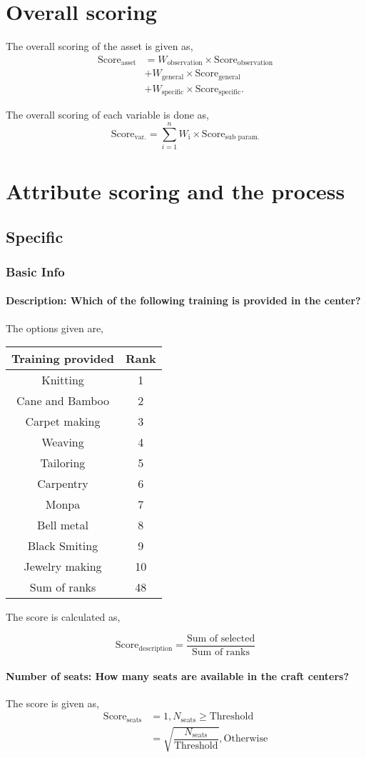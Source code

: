 \documentclass[oneside,twocolumn]{article}
\newcommand{\tsub}[2]{\text{#1}_{\text{#2}}}
\newcommand{\tsubb}[2]{#1_{\text{#2}}}
\newcommand{\dsub}[2]{\dfrac{\text{#1}}{\text{#2}}}
\newcommand{\multsel}[1]
{
	\[
		\tsub{Score}{#1} = \dsub{Sum of selected}{Sum of ranks}
	\]
}
\newenvironment{ttable}
{
\begin{center}
\begin{tabular}{c|c}
\hline
}
{
\\ \hline
\end{tabular}
\end{center}
}
\begin{document}
\section{Overall scoring}
The overall scoring of the asset is given as,
\begin{align*}
	\tsub{Score}{asset} &= \tsubb{W}{observation} \times \tsub{Score}{observation} \\
	&+ \tsubb{W}{general} \times \tsub{Score}{general} \\
	&+ \tsubb{W}{specific} \times \tsub{Score}{specific}.
\end{align*}

The overall scoring of each variable is done as,
\[
	\tsub{Score}{var.} = \sum_{i=1}^{n} \tsubb{W}{i} \times \tsub{Score}{sub param.}
\]
\section{Attribute scoring and the process}
\subsection{Specific}
\subsubsection{Basic Info}
\paragraph{Description: Which of the following training is provided in the center?} 
The options given are,
\begin{ttable}
	Training provided & Rank \\ \hline
	Knitting & 1 \\
	Cane and Bamboo & 2 \\
	Carpet making & 3 \\
	Weaving & 4 \\
	Tailoring & 5 \\
	Carpentry & 6 \\
	Monpa & 7 \\
	Bell metal & 8 \\
	Black Smiting & 9 \\
	Jewelry making & 10 \\ \hline
	Sum of ranks & 48 
\end{ttable}
The score is calculated as,
\multsel{description}
\paragraph{Number of seats: How many seats are available in the craft centers?}
The score is given as,
\begin{align*}
	\tsub{Score}{seats} &= 1, \tsubb{N}{seats} \ge \text{Threshold} \\
	&= \sqrt{\dfrac{\tsubb{N}{seats}}{\text{Threshold}}}, \text{Otherwise}
\end{align*}
\end{document}
